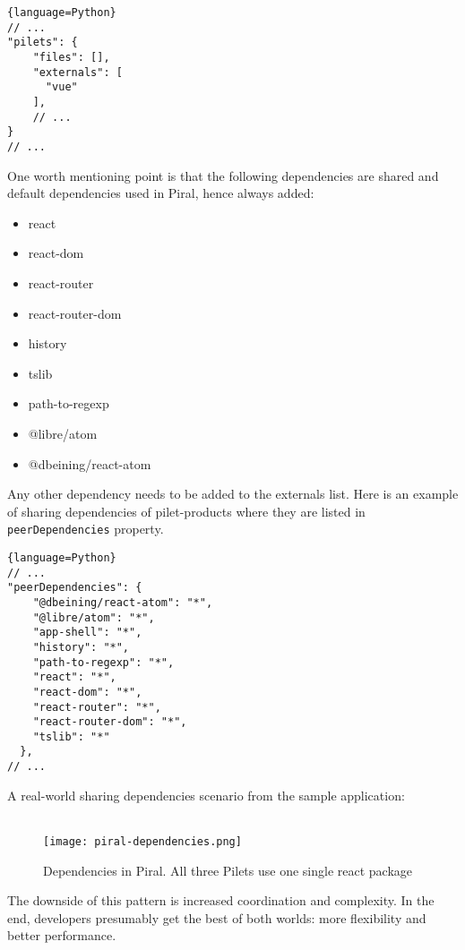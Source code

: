 \documentclass[a4paper]{book}
\begin{document}
\begin{lstlisting}{language=Python}
// ...
"pilets": {
    "files": [],
    "externals": [
      "vue"
    ],
    // ...
}
// ...
\end{lstlisting}
One worth mentioning point is that the following dependencies are shared and default dependencies used in Piral, hence always added:
\begin{itemize}
    \item react
    \item react-dom
    \item react-router
    \item react-router-dom
    \item history
    \item tslib
    \item path-to-regexp
    \item @libre/atom
    \item @dbeining/react-atom
    
\end{itemize}
Any other dependency needs to be added to the externals list.
Here is an example of sharing dependencies of pilet-products where they are listed in \verb|peerDependencies| property.
\begin{lstlisting}{language=Python}
// ...
"peerDependencies": {
    "@dbeining/react-atom": "*",
    "@libre/atom": "*",
    "app-shell": "*",
    "history": "*",
    "path-to-regexp": "*",
    "react": "*",
    "react-dom": "*",
    "react-router": "*",
    "react-router-dom": "*",
    "tslib": "*"
  },
// ...
\end{lstlisting}

A real-world sharing dependencies scenario from the sample application:
\\ \\
\begin{figure}[h!]
    \centering
    \captionsetup{justification=centering}
    \texttt{[image: piral-dependencies.png]}
    \caption{Dependencies in Piral. All three Pilets use one single react package}
    \label{fig:4}
\end{figure}

The downside of this pattern is increased coordination and complexity. In the end, developers presumably get the best of both worlds: more flexibility and better performance. 
\end{document}
